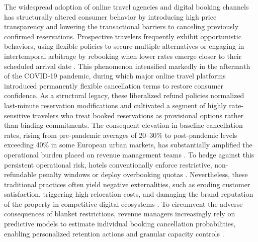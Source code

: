 \documentclass[pdflatex,iicol,sn-mathphys-ay]{sn-jnl}
\theoremstyle{thmstyleone}%
\theoremstyle{thmstyletwo}%
\theoremstyle{thmstylethree}%
\begin{document}
The widespread adoption of online travel agencies and digital booking channels has structurally altered consumer behavior by introducing high price transparency and lowering the transactional barriers to canceling previously confirmed reservations. Prospective travelers frequently exhibit opportunistic behaviors, using flexible policies to secure multiple alternatives \citep{chen2023prediction} or engaging in intertemporal arbitrage by rebooking when lower rates emerge \citep{mir2026decoding} closer to their scheduled arrival date \citep{ampountolas2025predicting}. This phenomenon intensified markedly in the aftermath of the COVID-19 pandemic, during which major online travel platforms introduced permanently flexible cancellation terms to restore consumer confidence. As a structural legacy, these liberalized refund policies normalized last-minute reservation modifications and cultivated a segment of highly rate-sensitive travelers who treat booked reservations as provisional options rather than binding commitments. The consequent elevation in baseline cancellation rates, rising from pre-pandemic averages of 20–30\% to post-pandemic levels exceeding 40\% in some European urban markets, has substantially amplified the operational burden placed on revenue management teams \citep{mir2026decoding}. To hedge against this persistent operational risk, hotels conventionally enforce restrictive, non-refundable penalty windows \citep{yang2024predicting} or deploy overbooking quotas \citep{antonio2017predicting}. Nevertheless, these traditional practices often yield negative externalities, such as eroding customer satisfaction, triggering high relocation costs, and damaging the brand reputation of the property in competitive digital ecosystems \citep{falk2018modelling}. To circumvent the adverse consequences of blanket restrictions, revenue managers increasingly rely on predictive models to estimate individual booking cancellation probabilities, enabling personalized retention actions and granular capacity controls \citep{antonio2017predicting, liu2023hospitality, talal2025hotel}.
\end{document}

